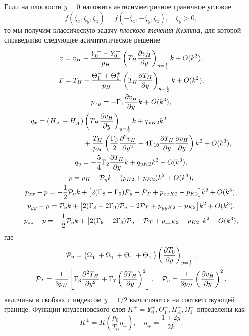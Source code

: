 Если на плоскости \(y=0\) наложить антисимметричное граничное условие
\begin{equation}\label{eq:1d:antisymmetry}
    f(\zeta_x,\zeta_y,\zeta_z) = f(-\zeta_x,-\zeta_y,\zeta_z), \quad \zeta_y>0,
\end{equation}
то мы получим классическую задачу \emph{плоского течения Куэтта},
для которой справедливо следующее асимптотическое решение
\begin{gather}
    v = v_H - \frac{Y_0^--Y_0^+}{p_H}\left(T_H\pder[v_H]{y}\right)_{y=\frac12}k + \OO{k^2}, \label{eq:Hilbert_U}\\
    T = T_H - \frac{\Theta_1^-+\Theta_1^+}{p_H}\left(T_H\pder[T_H]{y}\right)_{y=\frac12}k + \OO{k^2}, \label{eq:Hilbert_T}\\
    p_{xy} = -\Gamma_1\pder[v_H]{y}k + \OO{k^3}, \label{eq:Hilbert_Pxy}\\
    \begin{aligned}
        q_x = (H_A^--H_A^+)&\left(T_H\pder[v_H]{y}\right)_{y=\frac12}k + q_{xK2}k^2 \\
        &+ \frac{T_H}{p_H}\left( \frac{\Gamma_3}2 \pderdual[v_H]{y}
            + 4\Gamma_{10} \pder[T_H]{y}\pder[v_H]{y} \right)k^2 + \OO{k^3},
    \end{aligned}\label{eq:Hilbert_Qx}\\
    q_y = -\frac54\Gamma_2\pder[T_H]{y}k + q_{yK2}k^2 + \OO{k^3}, \label{eq:Hilbert_Qy}\\
    p = p_H - \mathcal{P}_\eta k + (p_{H2} + p_{K2})k^2 + \OO{k^3}, \label{eq:Hilbert_p}\\
    p_{xx} - p = -\frac12 \mathcal{P}_\eta k
        + \big[ 2(\Gamma_8+\Gamma_9)\mathcal{P}_u - \mathcal{P}_T + p_{xxK2}-p_{K2}\big]k^2
        + \OO{k^3}, \label{eq:Hilbert_Pxx}\\
    p_{yy} - p = \mathcal{P}_\eta k
        + \big[ 2(\Gamma_8-2\Gamma_9)\mathcal{P}_u + 2\mathcal{P}_T + p_{yyK2}-p_{K2} \big]k^2
        + \OO{k^3}, \label{eq:Hilbert_Pyy}\\
    p_{zz} - p = -\frac12 \mathcal{P}_\eta k
        + \big[ 2(\Gamma_9-2\Gamma_8)\mathcal{P}_u - \mathcal{P}_T + p_{zzK2}-p_{K2} \big]k^2
        + \OO{k^3}, \label{eq:Hilbert_Pzz}
\end{gather}
где
\begin{gather}\label{eq:mathcal_P_def}
    \mathcal{P}_\eta = \left(\Omega_1^-+\Omega_1^++\Theta_1^-+\Theta_1^+\right)
        \left(\pder[T_0]{y}\right)_{y=\frac12}, \\
    \mathcal{P}_T = \frac1{3p_H}\left[\Gamma_3 \pderdual[T_H]{y} + \Gamma_7\left(\pder[T_H]{y}\right)^2\right], \quad
    \mathcal{P}_u = \frac1{3p_H}\left(\pder[v_H]{y}\right)^2,
\end{gather}
величины в скобках с индексом \(y=1/2\) вычисляются на соответствующей границе.
Функции кнудсеновского слоя \(K^\pm = Y_0^\pm, \Theta_1^\pm, H_A^\pm, \Omega_1^\pm\) определены как
\begin{equation}\label{eq:nonlinear_knudsen_functions}
     K^\pm = K\left(\frac{p_0}{T_0}\eta_\pm\right), \quad \eta_\pm = \frac{1 \mp 2y}{2k}.
\end{equation}

